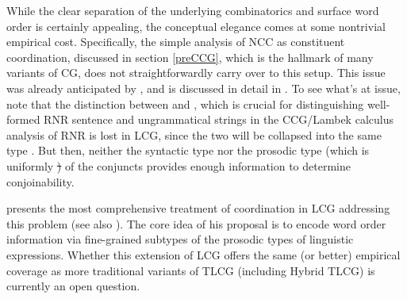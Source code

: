 \documentclass[output=paper]{langsci/langscibook}
\begin{document}
While the clear separation of the underlying combinatorics and surface
word order is certainly appealing, the conceptual elegance comes at
some nontrivial empirical cost. Specifically, the simple analysis of
NCC as constituent coordination, discussed in section \ref{preCCG},
which is the hallmark of many variants of CG, does not
straightforwardly carry over to this setup. This issue was already
anticipated by \citet{muskens01}, and is discussed in detail in
\citet{kubota-levine-coord}. To see what's at issue, note that
the distinction between  and , which
is crucial for distinguishing well-formed RNR sentence and
ungrammatical strings in the CCG/Lambek calculus analysis of RNR is lost in
LCG, since the two will be collapsed into the same type .
But then, neither the syntactic type nor the 
prosodic type (which is uniformly \st\xspace \shortarrow \st\xspace) of the conjuncts provides
enough information to determine conjoinability.

\citet{worth-diss} presents the most comprehensive treatment of coordination
in LCG addressing this problem (see also \citet{kanazawa15}). The core idea
of his proposal is to encode word order information via fine-grained
subtypes of the prosodic types of linguistic expressions. Whether this
extension of LCG offers the same (or better) empirical coverage as
more traditional variants of TLCG (including Hybrid TLCG) is currently an open
question.





\end{document}
